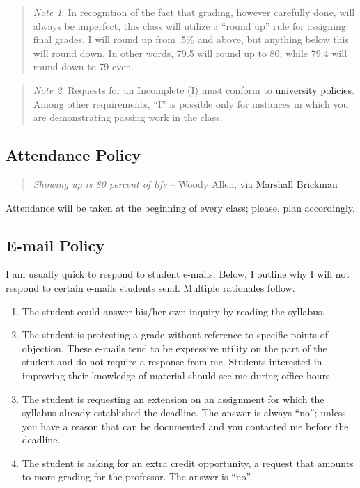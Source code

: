 \documentclass[11pt,]{article}
\providecommand{\tightlist}{%
  \setlength{\itemsep}{0pt}\setlength{\parskip}{0pt}}
\begin{document}
\begin{quote}
\emph{Note 1}: In recognition of the fact that grading, however
carefully done, will always be imperfect, this class will utilize a
``round up'' rule for assigning final grades. I will round up from .5\%
and above, but anything below this will round down. In other words, 79.5
will round up to 80, while 79.4 will round down to 79 even.
\end{quote}

\begin{quote}
\emph{Note 2}: Requests for an Incomplete (I) must conform to
\href{https://bit.ly/3bDxwZi}{university policies}. Among other
requirements, ``I'' is possible only for instances in which you are
demonstrating passing work in the class.
\end{quote}

\hypertarget{attendance-policy}{%
\subsection{Attendance Policy}\label{attendance-policy}}

\begin{quote}
\emph{Showing up is 80 percent of life} -- Woody Allen,
\href{http://quoteinvestigator.com/2013/06/10/showing-up/\#note-6553-1}{via
Marshall Brickman}
\end{quote}

Attendance will be taken at the beginning of every class; please, plan
accordingly.

\hypertarget{e-mail-policy}{%
\subsection{E-mail Policy}\label{e-mail-policy}}

I am usually quick to respond to student e-mails. Below, I outline why I
will not respond to certain e-mails students send. Multiple rationales
follow.

\begin{enumerate}
\def\labelenumi{\arabic{enumi}.}
\tightlist
\item
  The student could answer his/her own inquiry by reading the syllabus.
\item
  The student is protesting a grade without reference to specific points
  of objection. These e-mails tend to be expressive utility on the part
  of the student and do not require a response from me. Students
  interested in improving their knowledge of material should see me
  during office hours.
\item
  The student is requesting an extension on an assignment for which the
  syllabus already established the deadline. The answer is always
  ``no''; unless you have a reason that can be documented and you
  contacted me before the deadline.
\item
  The student is asking for an extra credit opportunity, a request that
  amounts to more grading for the professor. The answer is ``no''.
\end{enumerate}
\end{document}
